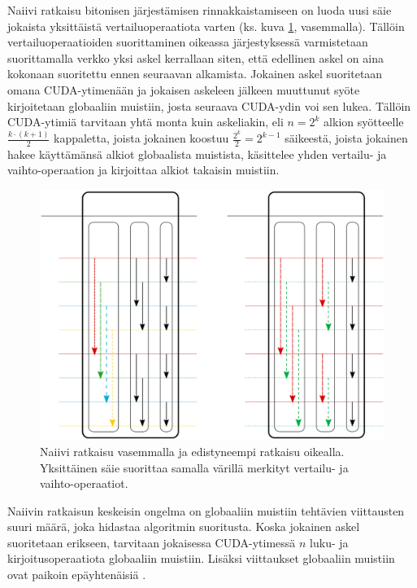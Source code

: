 \documentclass[a4paper,11pt]{article}
\begin{document}
Naiivi ratkaisu bitonisen järjestämisen rinnakkaistamiseen on luoda uusi säie jokaista yksittäistä vertailuoperaatiota varten (ks. kuva \ref{fig:bitonic_divided}, vasemmalla). Tällöin vertailuoperaatioiden suorittaminen oikeassa järjestyksessä varmistetaan suorittamalla verkko yksi askel kerrallaan siten, että edellinen askel on aina kokonaan suoritettu ennen seuraavan alkamista. Jokainen askel suoritetaan omana CUDA-ytimenään ja jokaisen askeleen jälkeen muuttunut syöte kirjoitetaan globaaliin muistiin, josta seuraava CUDA-ydin voi sen lukea. Tällöin CUDA-ytimiä tarvitaan yhtä monta kuin askeliakin, eli $n = 2^k$ alkion syötteelle $\frac{k \cdot (k + 1)}{2}$ kappaletta, joista jokainen koostuu $\frac{2^k}{2} = 2^{k-1}$ säikeestä, joista jokainen hakee käyttämänsä alkiot globaalista muistista, käsittelee yhden vertailu- ja vaihto-operaation ja kirjoittaa alkiot takaisin muistiin.

\begin{figure}
\centering
\includegraphics[scale = 0.8]{bitonic_divided}
\caption{Naiivi ratkaisu vasemmalla ja edistyneempi ratkaisu oikealla. Yksittäinen säie suorittaa samalla värillä merkityt vertailu- ja vaihto-operaatiot.}
\label{fig:bitonic_divided}
\end{figure}

Naiivin ratkaisun keskeisin ongelma on globaaliin muistiin tehtävien viittausten suuri määrä, joka hidastaa algoritmin suoritusta. Koska jokainen askel suoritetaan erikseen, tarvitaan jokaisessa CUDA-ytimessä $n$ luku- ja kirjoitusoperaatiota globaaliin muistiin. Lisäksi viittaukset globaaliin muistiin ovat paikoin epäyhtenäisiä \cite{peters2012gems}.
\end{document}
